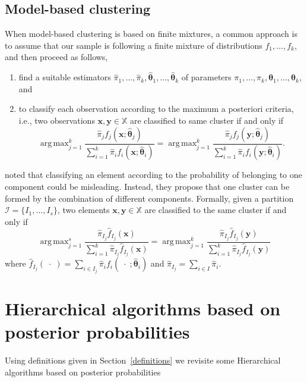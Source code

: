 \documentclass[10pt, a4paper]{article}
\DeclareMathOperator*{\argmax}{arg\,max}
\newcommand{\m}[1]{\boldsymbol{#1}}
\begin{document}
\subsection*{Model-based clustering}

When model-based clustering is based on finite mixtures, a common approach is to assume that our sample is following a finite mixture of distributions $f_1, \dots, f_k$, and then proceed as follows, 
\begin{enumerate}
\item find a suitable estimators $\hat{\pi}_1, \dots, \hat{\pi}_k, \hat{\m\theta}_1, \dots, \hat{\m\theta}_k$ of parameters $\pi_1, \dots, \pi_k, \m\theta_1, \dots, \m\theta_k$, and
\item to classify each observation according to the maximum a posteriori criteria, i.e., two observations $\m x, \m y \in \mathbb{X}$ are classified to same cluster if and only if
\[
\argmax_{j=1}^k \frac{ \hat{\pi}_j f_j(\m x ; \hat{\m\theta}_j) }{\sum_{i=1}^k \hat{\pi}_i f_i(\m x ; \hat{\m\theta}_i) } = \argmax_{j=1}^k \frac{ \hat{\pi}_j f_j(\m y ; \hat{\m\theta}_j) }{ \sum_{i=1}^k \hat{\pi}_i f_i(\m y ; \hat{\m\theta}_i) }.
\]
\end{enumerate}


\cite{lee2004combining,hennig2010methods,baudry2010combining,melnykov2013distribution,pastore2013merging} noted that classifying an element according to the probability of belonging to one component could be misleading. Instead, they propose that one cluster can be formed by the combination of different components. Formally, given a partition $\mathcal{I} = \{ I_1, \dots, I_s\}$, two elements $\m x, \m y \in \mathbb{X}$ are classified to the same cluster if and only if
\[
\argmax_{j=1}^s \frac{ \hat{\pi}_{I_j} \hat{f}_{I_j}(\m x) }{\sum_{i=1}^k \hat{\pi}_{I_j} \hat{f}_{I_j}(\m x ) } = \argmax_{j=1}^k \frac{ \hat{\pi}_{I_j} \hat{f}_{I_j}(\m y) }{ \sum_{i=1}^k \hat{\pi}_{I_j} \hat{f}_{I_j}(\m y) }
\]
where $\hat{f}_{I_j}(\; \cdot \;) = \sum_{i \in I_j} \hat{\pi}_i f_i(\; \cdot \; ; \hat{\m\theta}_i)$ and $\hat{\pi}_{I_j} =  \sum_{i \in I} \hat{\pi}_i$.

\section{Hierarchical algorithms based on posterior probabilities}

Using definitions given in Section~\ref{definitions} we revisite some Hierarchical algorithms based on posterior probabilities
\end{document}

